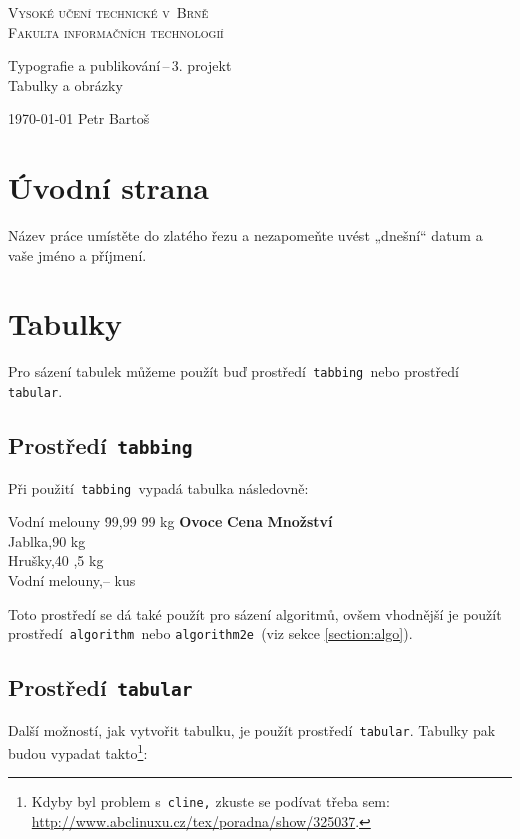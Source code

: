 \documentclass[11pt, a4paper, titlepage]{article}
\begin{document}
\begin{titlepage}
\begin{center}
{\Huge\textsc{
Vysoké učení technické v~Brně\\[0.4em]}}
{\huge\textsc{
Fakulta informačních technologií}}

{\LARGE
Typografie a publikování\,--\,3. projekt\\}
\Huge{Tabulky a obrázky}

{\Large
\today
\hfill
Petr Bartoš
}
\end{center}
\end{titlepage}


\section{Úvodní strana}
Název práce umístěte do zlatého řezu a nezapomeňte uvést „dnešní“ datum a vaše jméno a příjmení.

\section{Tabulky}
Pro sázení tabulek můžeme použít buď prostředí\verb| tabbing |nebo prostředí\verb| tabular|.

\subsection{Prostředí\texttt{ tabbing }}
Při použití\verb| tabbing |vypadá tabulka následovně:
\begin{tabbing}
Vodní melouny \quad \= 99,99 \quad \= 99 kg \kill
\textbf{Ovoce} \> \textbf{Cena} \> \textbf{Množství}\\
Jablka,90  kg\\
Hrušky,40 ,5 kg\\
Vodní melouny,--  kus\\
\end{tabbing}
Toto prostředí se dá také použít pro sázení algoritmů, ovšem vhodnější je použít prostředí\verb| algorithm |nebo \verb|algorithm2e |(viz sekce \ref*{section:algo}).

\subsection{Prostředí\texttt{ tabular }}
Další možností, jak vytvořit tabulku, je použít prostředí\verb| tabular|. Tabulky pak budou vypadat takto\footnote{Kdyby byl problem s\texttt{ cline,} zkuste se podívat třeba sem: \url{http://www.abclinuxu.cz/tex/poradna/show/325037}.}:
\end{document}
